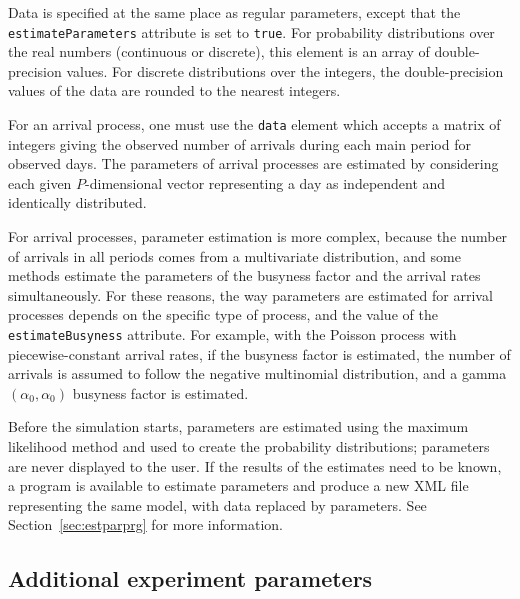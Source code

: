 Data is specified at the same place as regular parameters, except that
the \texttt{estimate\-Parameters} attribute is set to \texttt{true}.
For probability
distributions over the real numbers (continuous or discrete), this
element is an array of double-precision values.
For discrete distributions over the integers, the double-precision
values of the data are rounded to the nearest integers.

For an arrival process, one must use the
\texttt{data} element which accepts a
matrix of integers giving the observed number of arrivals during each
main period for observed days.
The parameters of arrival processes are estimated by considering each
given
$P$-dimensional vector representing a day as independent and
identically distributed.

For arrival processes, parameter estimation is more complex, because
the number of arrivals in all periods comes from a multivariate
distribution, and some methods estimate the parameters of the busyness
factor and the arrival rates simultaneously.
For these reasons, the way parameters are estimated for arrival
processes depends on the specific type of process, and the value of
the \texttt{estimate\-Busyness} attribute.
For example, with the Poisson process with piecewise-constant arrival
rates, if the busyness factor is estimated, the number of arrivals is
assumed to follow the negative multinomial distribution, and a
gamma$(\alpha_0,\alpha_0)$ busyness factor is estimated.

Before the simulation starts, parameters are estimated using the
maximum likelihood method and used to create the
probability distributions; parameters are never displayed to the user.
If the results of the estimates need to
be known, a program is available to estimate parameters and produce a
new XML file representing the same model, with data replaced by
parameters.
See Section~\ref{sec:estparprg} for more information.

\subsection{Additional experiment parameters}

